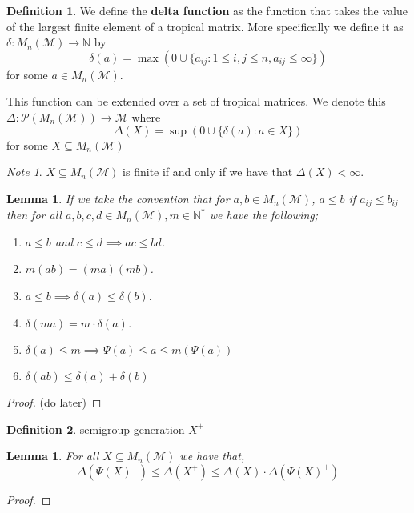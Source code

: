 \documentclass[12pt,a4paper]{amsart}
\newcommand{\N}{\mathbb{N}}
\newcommand{\TM}{\mathcal{M}}
\newtheorem{lem}[thm]{Lemma}
\theoremstyle{definition}
\newtheorem{defn}{Definition}[section]
\theoremstyle{remark}
\newtheorem*{note}{Note}
\begin{document}
\begin{defn}
We define the \textbf{delta function} as the function that takes the value of the largest finite element of a tropical matrix. More specifically we define it as $\delta:M_n(\TM)\to\N$ by
\begin{equation}
    \delta(a) = \max(0\cup\{ a_{ij} : 1\leq i,j \leq n, a_{ij}\leq\infty \})
\end{equation}
for some $a\in M_n(\TM)$.

This function can be extended over a set of tropical matrices. We denote this $\Delta:\mathcal{P}(M_n(\TM))\to\TM$ where
\begin{equation}
    \Delta(X) = \sup(0\cup\{ \delta(a) : a\in X \})
\end{equation}
for some $X\subseteq M_n(\TM)$
\end{defn}

\begin{note}
$X\subseteq M_n(\TM)$ is finite if and only if we have that $\Delta(X)<\infty$.
\end{note}

\begin{lem}\label{lem:simon1}
If we take the convention that for $a,b\in M_n(\TM)$, $a\leq b$ if $a_{ij}\leq b_{ij}$ then for all $a,b,c,d\in M_n(\TM), m\in\N^*$ we have the following;
\begin{enumerate}
    \item $a\leq b$ and $c\leq d \implies ac \leq bd$.
    \item $m(ab) = (ma)(mb)$.
    \item $a\leq b \implies \delta(a)\leq \delta(b)$.
    \item $\delta(ma) = m\cdot\delta(a)$.
    \item $\delta(a)\leq m \implies \Psi(a)\leq a\leq m(\Psi(a))$
    \item $\delta(ab)\leq\delta(a)+\delta(b)$
\end{enumerate}
\end{lem}
\begin{proof}
(do later)
\end{proof}

\begin{defn}
semigroup generation $X^+$
\end{defn}

\begin{lem}\label{lem:simon2}
For all $X\subseteq M_n(\TM)$ we have that,
\begin{equation}
    \Delta(\Psi(X)^+)\leq\Delta(X^+)\leq\Delta(X)\cdot\Delta(\Psi(X)^+)
\end{equation}
\end{lem}
\begin{proof}

\end{proof}
\end{document}
